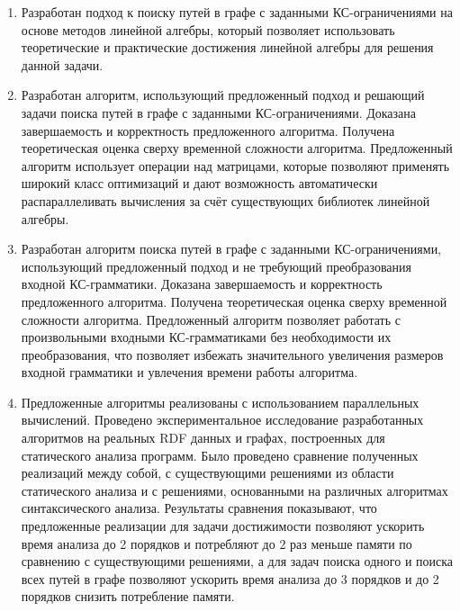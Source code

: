 {}
\begin{enumerate}[beginpenalty=10000] %
	\item Разработан подход к поиску путей в графе с заданными КС-ограничениями на основе методов линейной алгебры, который позволяет использовать теоретические и практические достижения линейной алгебры для решения данной задачи.
	\item Разработан алгоритм, использующий предложенный подход и решающий задачи поиска путей в графе с заданными КС-ограничениями. Доказана завершаемость и корректность предложенного алгоритма. Получена теоретическая оценка сверху временной сложности алгоритма. Предложенный алгоритм использует операции над матрицами, которые позволяют применять широкий класс оптимизаций и дают возможность автоматически распараллеливать вычисления за счёт существующих библиотек линейной алгебры.
	\item Разработан алгоритм поиска путей в графе с заданными КС-ограничениями, использующий предложенный подход и не требующий преобразования входной КС-грамматики. Доказана завершаемость и корректность предложенного алгоритма. Получена теоретическая оценка сверху временной сложности алгоритма. Предложенный алгоритм позволяет работать с произвольными входными КС-грамматиками без необходимости их преобразования, что позволяет избежать значительного увеличения размеров входной грамматики и увлечения времени работы алгоритма.
	\item Предложенные алгоритмы реализованы с использованием параллельных вычислений. Проведено экспериментальное исследование разработанных алгоритмов на реальных RDF данных и графах, построенных для статического анализа программ. Было проведено сравнение полученных реализаций между собой, с существующими решениями из области статического анализа и с решениями, основанными на различных алгоритмах синтаксического анализа. Результаты сравнения показывают, что предложенные реализации для задачи достижимости позволяют ускорить время анализа до 2 порядков и потребляют до 2 раз меньше памяти по сравнению с существующими решениями, а для задач поиска одного и поиска всех путей в графе позволяют ускорить время анализа до 3 порядков и до 2 порядков снизить потребление памяти.
\end{enumerate}

